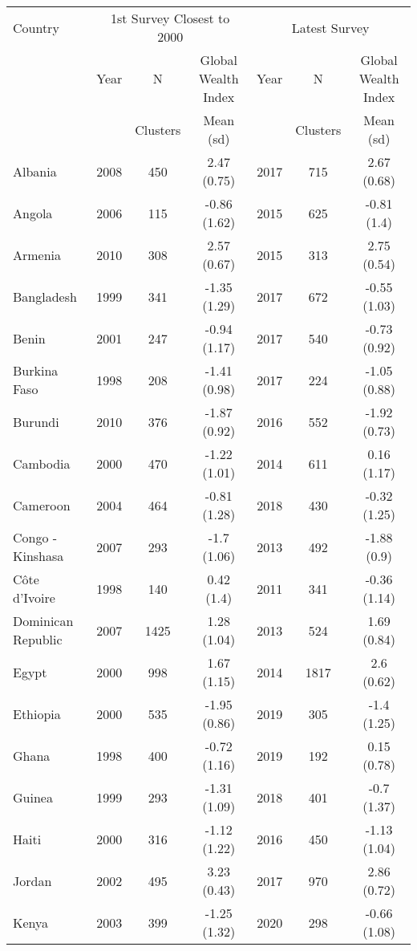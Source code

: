 \begin{tabular}{l | ccc | ccc} 
\hline 
Country & \multicolumn{3}{c}{1st Survey Closest to 2000} & \multicolumn{3}{c}{Latest Survey} \\ 
        & Year & N        & Global Wealth Index      & Year & N        & Global Wealth Index    \\ 
        &      & Clusters & Mean (sd)                &      & Clusters & Mean (sd)      \\ 
\hline 
Albania & 2008 & 450 & 2.47 (0.75)  & 2017 & 715 & 2.67 (0.68)   \\ 
 Angola & 2006 & 115 & -0.86 (1.62)  & 2015 & 625 & -0.81 (1.4)   \\ 
 Armenia & 2010 & 308 & 2.57 (0.67)  & 2015 & 313 & 2.75 (0.54)   \\ 
 Bangladesh & 1999 & 341 & -1.35 (1.29)  & 2017 & 672 & -0.55 (1.03)   \\ 
 Benin & 2001 & 247 & -0.94 (1.17)  & 2017 & 540 & -0.73 (0.92)   \\ 
 Burkina Faso & 1998 & 208 & -1.41 (0.98)  & 2017 & 224 & -1.05 (0.88)   \\ 
 Burundi & 2010 & 376 & -1.87 (0.92)  & 2016 & 552 & -1.92 (0.73)   \\ 
 Cambodia & 2000 & 470 & -1.22 (1.01)  & 2014 & 611 & 0.16 (1.17)   \\ 
 Cameroon & 2004 & 464 & -0.81 (1.28)  & 2018 & 430 & -0.32 (1.25)   \\ 
 Congo - Kinshasa & 2007 & 293 & -1.7 (1.06)  & 2013 & 492 & -1.88 (0.9)   \\ 
 Côte d’Ivoire & 1998 & 140 & 0.42 (1.4)  & 2011 & 341 & -0.36 (1.14)   \\ 
 Dominican Republic & 2007 & 1425 & 1.28 (1.04)  & 2013 & 524 & 1.69 (0.84)   \\ 
 Egypt & 2000 & 998 & 1.67 (1.15)  & 2014 & 1817 & 2.6 (0.62)   \\ 
 Ethiopia & 2000 & 535 & -1.95 (0.86)  & 2019 & 305 & -1.4 (1.25)   \\ 
 Ghana & 1998 & 400 & -0.72 (1.16)  & 2019 & 192 & 0.15 (0.78)   \\ 
 Guinea & 1999 & 293 & -1.31 (1.09)  & 2018 & 401 & -0.7 (1.37)   \\ 
 Haiti & 2000 & 316 & -1.12 (1.22)  & 2016 & 450 & -1.13 (1.04)   \\ 
 Jordan & 2002 & 495 & 3.23 (0.43)  & 2017 & 970 & 2.86 (0.72)   \\ 
 Kenya & 2003 & 399 & -1.25 (1.32)  & 2020 & 298 & -0.66 (1.08)   \\ 

\end{tabular}
